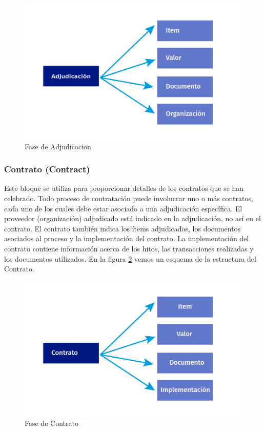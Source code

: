 \begin{figure}[h!]
    \centering
    \includegraphics[width=150mm]{figuras/Diagramas_Adjudicacion.png}
    \caption{Fase de Adjudicacion}
    \label{img:Fase de Adjudicación}
\end{figure}

\subsubsection{Contrato (Contract)}
Este bloque se utiliza para proporcionar detalles de los contratos que se han celebrado. Todo proceso de contratación puede involucrar uno o más contratos, cada uno de los cuales debe estar asociado a una adjudicación específica. El proveedor (organización) adjudicado está indicado en la adjudicación, no así en el contrato. El contrato también indica los ítems adjudicados, los documentos asociados al proceso y la implementación del contrato. La implementación del contrato contiene información acerca de los hitos, las transacciones realizadas y los documentos utilizados. En la figura \ref{img:Fase de Contrato} vemos un esquema de la estructura del Contrato.

\begin{figure}[h!]
    \centering
    \includegraphics[width=150mm]{figuras/Diagramas_Contrato.png}
    \caption{Fase de Contrato}
    \label{img:Fase de Contrato}
\end{figure}

